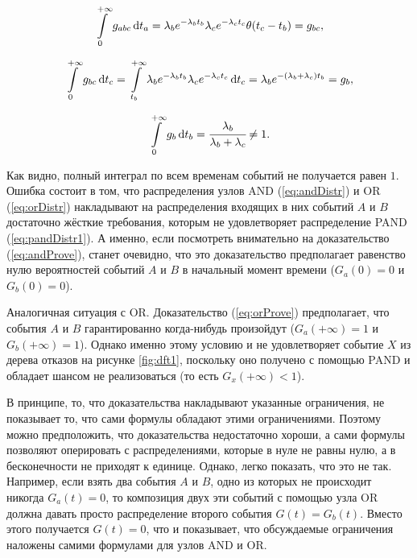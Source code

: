 \documentclass[a4paper, 12pt]{article}
\begin{document}
\begin{equation*}
  \int\limits_0^{+\infty} g_{abc} \dif t_a =
  \lambda_b e^{-\lambda_b t_b} \lambda_c e^{-\lambda_c t_c} \theta(t_c - t_b) = g_{bc},
\end{equation*}

\begin{equation*}
  \int\limits_0^{+\infty} g_{bc} \dif t_c =
  \int\limits_{t_b}^{+\infty} \lambda_b e^{-\lambda_b t_b} \lambda_c e^{-\lambda_c t_c} \dif t_c
  = \lambda_b e^{-(\lambda_b + \lambda_c) t_b} = g_b,
\end{equation*}

\begin{equation*}
  \int\limits_0^{+\infty} g_b \dif t_b = \cfrac{\lambda_b}{\lambda_b + \lambda_c} \neq 1.
\end{equation*}

Как видно, полный интеграл по всем временам событий не получается равен $1$. Ошибка состоит в том, что распределения узлов AND (\ref{eq:andDistr}) и OR (\ref{eq:orDistr}) накладывают на распределения входящих в них событий $A$ и $B$ достаточно жёсткие требования, которым не удовлетворяет распределение PAND (\ref{eq:pandDistr1}). А именно, если посмотреть внимательно на доказательство (\ref{eq:andProve}), станет очевидно, что это доказательство предполагает равенство нулю вероятностей событий $A$ и $B$ в начальный момент времени ($G_a(0) = 0$ и $G_b(0) = 0$).

Аналогичная ситуация с OR. Доказательство (\ref{eq:orProve}) предполагает, что события $A$ и $B$ гарантированно когда-нибудь произойдут ($G_a(+\infty) = 1$ и $G_b(+\infty) = 1$). Однако именно этому условию и не удовлетворяет событие $X$ из дерева отказов на рисунке \ref{fig:dft1}, поскольку оно получено с помощью PAND и обладает шансом не реализоваться (то есть $G_x(+\infty) < 1$).

В принципе, то, что доказательства накладывают указанные ограничения, не показывает то, что сами формулы обладают этими ограничениями. Поэтому можно предположить, что доказательства недостаточно хороши, а сами формулы позволяют оперировать с распределениями, которые в нуле не равны нулю, а в бесконечности не приходят к единице. Однако, легко показать, что это не так. Например, если взять два события $A$ и $B$, одно из которых не происходит никогда $G_a(t) = 0$, то композиция двух эти событий с помощью узла OR должна давать просто распределение второго события $G(t) = G_b(t)$. Вместо этого получается $G(t) = 0$, что и показывает, что обсуждаемые ограничения наложены самими формулами для узлов AND и OR.
\end{document}
